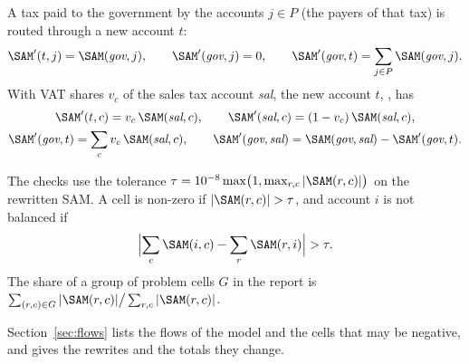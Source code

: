 A tax paid to the government by the accounts $j \in P$ (the payers of that
tax) is routed through a new account $t$:
\begin{equation*}
\SAM'(t, j) = \SAM(\textit{gov}, j), \qquad \SAM'(\textit{gov}, j) = 0, \qquad
\SAM'(\textit{gov}, t) = \sum_{j \in P} \SAM(\textit{gov}, j) .
\end{equation*}
With VAT shares $v_c$ of the sales tax account \textit{sal}, the new account
$t$, , has
\begin{gather*}
\SAM'(t, c) = v_c\,\SAM(\textit{sal}, c), \qquad
\SAM'(\textit{sal}, c) = (1 - v_c)\,\SAM(\textit{sal}, c),\\
\SAM'(\textit{gov}, t) = \sum_c v_c\,\SAM(\textit{sal}, c), \qquad
\SAM'(\textit{gov}, \textit{sal}) = \SAM(\textit{gov}, \textit{sal}) - \SAM'(\textit{gov}, t) .
\end{gather*}

The checks use the tolerance $\tau = 10^{-8} \max\bigl(1, \max_{r,c}
|\SAM(r, c)|\bigr)$ on the rewritten SAM. A cell is non-zero if
$|\SAM(r, c)| > \tau$, and account $i$ is not balanced if
\begin{equation*}
\Bigl|\sum_c \SAM(i, c) - \sum_r \SAM(r, i)\Bigr| > \tau .
\end{equation*}
The share of a group of problem cells $G$ in the report is
$\sum_{(r,c) \in G} |\SAM(r, c)| \big/ \sum_{r,c} |\SAM(r, c)|$.

Section~\ref{sec:flows} lists the flows of the model and the cells that may be
negative, and  gives the rewrites and the totals they
change.


\begin{alsosee}
\end{alsosee}
